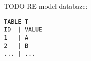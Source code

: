 
TODO RE model databaze:
\begin{lstlisting}[caption={Example of database}, label={code:db}]
TABLE T
ID  | VALUE
1   | A
2   | B
... | ...
\end{lstlisting}

